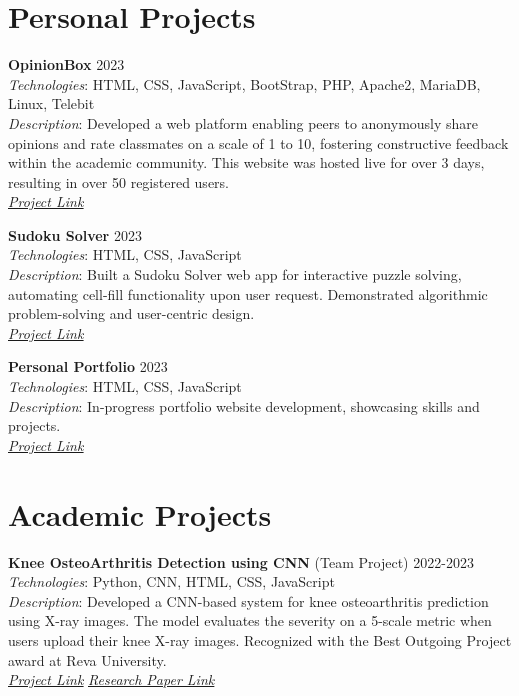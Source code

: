 \documentclass[a4paper,15pt]{article}
\begin{document}
\section*{Personal Projects}
\textbf{OpinionBox} \hfill 2023 \\
\textit{Technologies}: HTML, CSS, JavaScript, BootStrap, PHP, Apache2, MariaDB, Linux, Telebit \\
\textit{Description}: Developed a web platform enabling peers to anonymously share opinions and rate classmates on a scale of 1 to 10, fostering constructive feedback within the academic community. This website was hosted live for over 3 days, resulting in over 50 registered users. \\
\textit{\href{https://github.com/yashasc2k1/OpinionBox}{\underline{Project Link}}}

\textbf{Sudoku Solver} \hfill 2023 \\
\textit{Technologies}: HTML, CSS, JavaScript \\
\textit{Description}: Built a Sudoku Solver web app for interactive puzzle solving, automating cell-fill functionality upon user request. Demonstrated algorithmic problem-solving and user-centric design. \\
\textit{\href{https://yashasc2k1.github.io/SudokuSolver}{\underline{Project Link}}}

\textbf{Personal Portfolio} \hfill 2023 \\
\textit{Technologies}: HTML, CSS, JavaScript \\
\textit{Description}: In-progress portfolio website development, showcasing skills and projects. \\
\textit{\href{https://yashasc2k1.github.io/YashasChandrashekar/}{\underline{Project Link}}}

\section*{Academic Projects}
\textbf{Knee OsteoArthritis Detection using CNN} (Team Project) \hfill 2022-2023 \\
\textit{Technologies}: Python, CNN, HTML, CSS, JavaScript \\
\textit{Description}: Developed a CNN-based system for knee osteoarthritis prediction using X-ray images. The model evaluates the severity on a 5-scale metric when users upload their knee X-ray images. Recognized with the Best Outgoing Project award at Reva University. \\
\textit{\href{https://github.com/yashasc2k1/KneeOsteoArthritis}{\underline{Project Link}}} \textit{\href{https://www.ijraset.com/research-paper/knee-osteoarthritis-detection-and-severity-prediction}{\underline{Research Paper Link}}}
\end{document}
